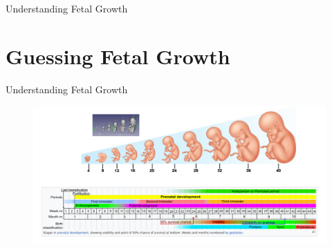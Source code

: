 

{
\begin{frame}{}

\BigSizeFont
Understanding Fetal Growth
\end{frame}
}




\section{Guessing Fetal Growth}



{
\begin{frame}{Understanding Fetal Growth}
      \begin{figure}
        \centering
        \includegraphics[width=1.0\textwidth]{./figures/fetal-growth/versions/drawing-v01v01.png}
      \end{figure}
\end{frame}
}




